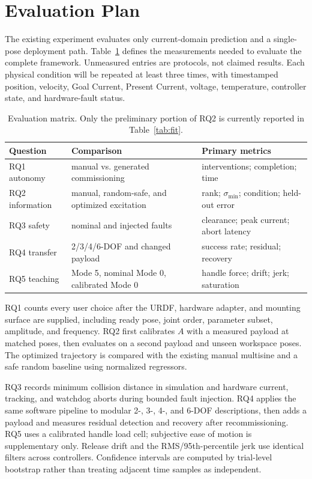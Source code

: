 \documentclass[conference]{IEEEtran}
\begin{document}
\section{Evaluation Plan}
The existing experiment evaluates only current-domain prediction and a
single-pose deployment path. Table~\ref{tab:protocol} defines the measurements
needed to evaluate the complete framework. Unmeasured entries are protocols,
not claimed results. Each physical condition will be repeated at least three
times, with timestamped position, velocity, Goal Current, Present Current,
voltage, temperature, controller state, and hardware-fault status.

\begin{table}[t]
\caption{Evaluation matrix. Only the preliminary portion of RQ2 is currently
reported in Table~\ref{tab:fit}.}
\label{tab:protocol}
\centering
\scriptsize
\begin{tabular}{@{}p{11mm}p{23mm}p{28mm}@{}}
\toprule
Question & Comparison & Primary metrics \\
\midrule
RQ1 autonomy & manual vs. generated commissioning & interventions; completion; time \\
RQ2 information & manual, random-safe, and optimized excitation & rank; $\sigma_{\min}$; condition; held-out error \\
RQ3 safety & nominal and injected faults & clearance; peak current; abort latency \\
RQ4 transfer & 2/3/4/6-DOF and changed payload & success rate; residual; recovery \\
RQ5 teaching & Mode 5, nominal Mode 0, calibrated Mode 0 & handle force; drift; jerk; saturation \\
\bottomrule
\end{tabular}
\end{table}

RQ1 counts every user choice after the URDF, hardware adapter, and mounting
surface are supplied, including ready pose, joint order, parameter subset,
amplitude, and frequency. RQ2 first calibrates $A$ with a measured payload at
matched poses, then evaluates on a second payload and unseen workspace poses.
The optimized trajectory is compared with the existing manual multisine and a
safe random baseline using normalized regressors.

RQ3 records minimum collision distance in simulation and hardware current,
tracking, and watchdog aborts during bounded fault injection. RQ4 applies the
same software pipeline to modular 2-, 3-, 4-, and 6-DOF descriptions, then adds
a payload and measures residual detection and recovery after recommissioning.
RQ5 uses a calibrated handle load cell; subjective ease of motion is
supplementary only. Release drift and the RMS/95th-percentile jerk use identical
filters across controllers. Confidence intervals are computed by trial-level
bootstrap rather than treating adjacent time samples as independent.
\end{document}

